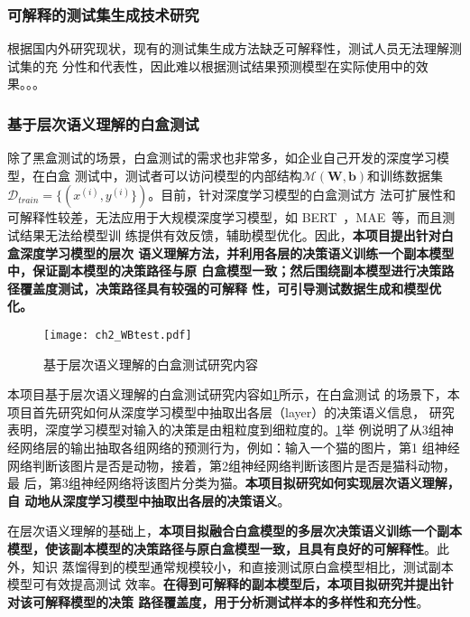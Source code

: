 \subsubsection{可解释的测试集生成技术研究}
根据国内外研究现状，现有的测试集生成方法缺乏可解释性，测试人员无法理解测试集的充
分性和代表性，因此难以根据测试结果预测模型在实际使用中的效果。。。





\subsubsection{基于层次语义理解的白盒测试}

除了黑盒测试的场景，白盒测试的需求也非常多，如企业自己开发的深度学习模型，在白盒
测试中，测试者可以访问模型的内部结构$\mathcal M(\bm W, \bm b)$和训练数据集
$\mathcal D_{train}=\{(x^{(i)}, y^{(i)}\})$。目前，针对深度学习模型的白盒测试方
法可扩展性和可解释性较差，无法应用于大规模深度学习模型，如
BERT~\cite{kenton2019bert}，MAE~\cite{he2021masked}等，而且测试结果无法给模型训
练提供有效反馈，辅助模型优化。因此，\textbf{本项目提出针对白盒深度学习模型的层次
语义理解方法，并利用各层的决策语义训练一个副本模型中，保证副本模型的决策路径与原
白盒模型一致；然后围绕副本模型进行决策路径覆盖度测试，决策路径具有较强的可解释
性，可引导测试数据生成和模型优化。}

\begin{figure}[htp]
    \begin{small}
        \begin{center}
            \texttt{[image: ch2\_WBtest.pdf]}
        \end{center}
        \caption{基于层次语义理解的白盒测试研究内容}
        \label{fig:ch2:WBtest}
    \end{small}
\end{figure}

本项目基于层次语义理解的白盒测试研究内容如\cref{fig:ch2:WBtest}所示，在白盒测试
的场景下，本项目首先研究如何从深度学习模型中抽取出各层（layer）的决策语义信息，
研究表明，深度学习模型对输入的决策是由粗粒度到细粒度的。\cref{fig:ch2:WBtest}举
例说明了从3组神经网络层的输出抽取各组网络的预测行为，例如：输入一个猫的图片，第1
组神经网络判断该图片是否是动物，接着，第2组神经网络判断该图片是否是猫科动物，最
后，第3组神经网络将该图片分类为猫。\textbf{本项目拟研究如何实现层次语义理解，自
动地从深度学习模型中抽取出各层的决策语义}。

在层次语义理解的基础上，\textbf{本项目拟融合白盒模型的多层次决策语义训练一个副本
模型，使该副本模型的决策路径与原白盒模型一致，且具有良好的可解释性}。此外，知识
蒸馏得到的模型通常规模较小，和直接测试原白盒模型相比，测试副本模型可有效提高测试
效率。\textbf{在得到可解释的副本模型后，本项目拟研究并提出针对该可解释模型的决策
路径覆盖度，用于分析测试样本的多样性和充分性}。

